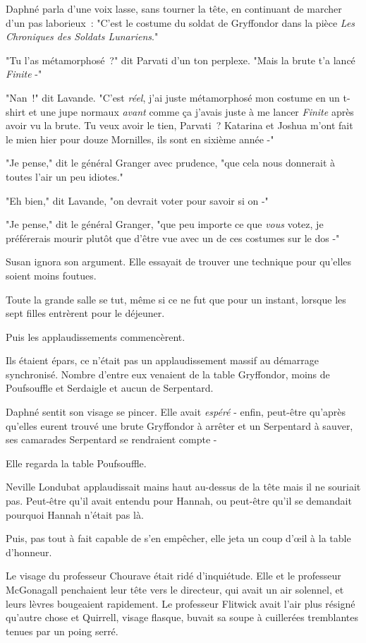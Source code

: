 Daphné parla d'une voix lasse, sans tourner la tête, en continuant de marcher d'un pas laborieux~: "C'est le costume du soldat de Gryffondor dans la pièce \emph{Les Chroniques des Soldats Lunariens}."

"Tu l'as métamorphosé~?" dit Parvati d'un ton perplexe. "Mais la brute t'a lancé \emph{Finite} -"

"Nan~!" dit Lavande. "C'est \emph{réel}, j'ai juste métamorphosé mon costume en un t-shirt et une jupe normaux \emph{avant} comme ça j'avais juste à me lancer \emph{Finite} après avoir vu la brute. Tu veux avoir le tien, Parvati~? Katarina et Joshua m'ont fait le mien hier pour douze Mornilles, ils sont en sixième année -"

"Je pense," dit le général Granger avec prudence, "que cela nous donnerait à toutes l'air un peu idiotes."

"Eh bien," dit Lavande, "on devrait voter pour savoir si on -"

"Je pense," dit le général Granger, "que peu importe ce que \emph{vous} votez, je préférerais mourir plutôt que d'être vue avec un de ces costumes sur le dos -"

Susan ignora son argument. Elle essayait de trouver une technique pour qu'elles soient moins foutues.

\later

Toute la grande salle se tut, même si ce ne fut que pour un instant, lorsque les sept filles entrèrent pour le déjeuner.

Puis les applaudissements commencèrent.

Ils étaient épars, ce n'était pas un applaudissement massif au démarrage synchronisé. Nombre d'entre eux venaient de la table Gryffondor, moins de Poufsouffle et Serdaigle et aucun de Serpentard.

Daphné sentit son visage se pincer. Elle avait \emph{espéré} - enfin, peut-être qu'après qu'elles eurent trouvé une brute Gryffondor à arrêter et un Serpentard à sauver, ses camarades Serpentard se rendraient compte -

Elle regarda la table Poufsouffle.

Neville Londubat applaudissait mains haut au-dessus de la tête mais il ne souriait pas. Peut-être qu'il avait entendu pour Hannah, ou peut-être qu'il se demandait pourquoi Hannah n'était pas là.

Puis, pas tout à fait capable de s'en empêcher, elle jeta un coup d'œil à la table d'honneur.

Le visage du professeur Chourave était ridé d'inquiétude. Elle et le professeur McGonagall penchaient leur tête vers le directeur, qui avait un air solennel, et leurs lèvres bougeaient rapidement. Le professeur Flitwick avait l'air plus résigné qu'autre chose et Quirrell, visage flasque, buvait sa soupe à cuillerées tremblantes tenues par un poing serré.

